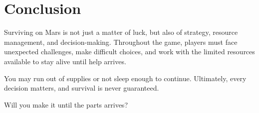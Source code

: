 \section{Conclusion}

Surviving on Mars is not just a matter of luck, but also of strategy, resource management, and decision-making. Throughout the game, players must face unexpected challenges, make difficult choices, and work with the limited resources available to stay alive until help arrives.

You may run out of supplies or not sleep enough to continue. Ultimately, every decision matters, and survival is never guaranteed.

Will you make it until the parts arrives?



